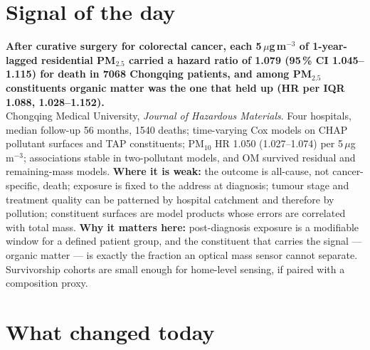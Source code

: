 \documentclass[10pt]{article}
\begin{document}
\vspace{6mm}

\section*{\sffamily\bfseries\color{Deep}Signal of the day}
\vspace{-1.5mm}{\color{Amber}\rule{\linewidth}{1.1pt}}\vspace{2.5mm}

\begin{keybox}
{\sffamily\bfseries\small\color{Deep}After curative surgery for colorectal cancer, each 5\,$\mu$g\,m$^{-3}$ of 1-year-lagged residential PM$_{2.5}$ carried a hazard ratio of 1.079 (95\,\% CI 1.045--1.115) for death in 7068 Chongqing patients, and among PM$_{2.5}$ constituents organic matter was the one that held up (HR per IQR 1.088, 1.028--1.152).}\\[1.4mm]
\footnotesize
Chongqing Medical University, \textit{Journal of Hazardous Materials}. Four hospitals, median follow-up 56 months, 1540 deaths; time-varying Cox models on CHAP pollutant surfaces and TAP constituents; PM$_{10}$ HR 1.050 (1.027--1.074) per 5\,$\mu$g\,m$^{-3}$; associations stable in two-pollutant models, and OM survived residual and remaining-mass models.
\textbf{Where it is weak:} the outcome is all-cause, not cancer-specific, death; exposure is fixed to the address at diagnosis; tumour stage and treatment quality can be patterned by hospital catchment and therefore by pollution; constituent surfaces are model products whose errors are correlated with total mass.
\textbf{Why it matters here:} post-diagnosis exposure is a modifiable window for a defined patient group, and the constituent that carries the signal --- organic matter --- is exactly the fraction an optical mass sensor cannot separate. Survivorship cohorts are small enough for home-level sensing, if paired with a composition proxy.\par
\end{keybox}

\vspace{3mm}

\section*{\sffamily\bfseries\color{Deep}What changed today}
\vspace{-1.5mm}{\color{Amber}\rule{\linewidth}{1.1pt}}\vspace{2.5mm}
\end{document}
